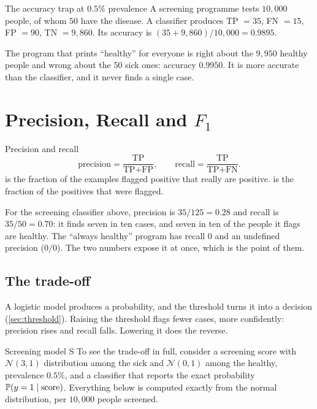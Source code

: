 \begin{workedexample}{The accuracy trap at $0.5\%$ prevalence}
A screening programme tests $10{,}000$ people, of whom $50$ have the disease. A
classifier produces TP $= 35$, FN $= 15$, FP $= 90$, TN $= 9{,}860$. Its accuracy
is $(35 + 9{,}860)/10{,}000 = 0.9895$.

The program that prints ``healthy'' for everyone is right about the $9{,}950$
healthy people and wrong about the $50$ sick ones: accuracy $0.9950$. It is more
accurate than the classifier, and it never finds a single case.
\end{workedexample}

\section{Precision, Recall and \texorpdfstring{$F_1$}{F1}}
\label{sec:precision-recall}

\begin{defbox}{Precision and recall}
\[
  \text{precision} = \frac{\text{TP}}{\text{TP} + \text{FP}}, \qquad
  \text{recall} = \frac{\text{TP}}{\text{TP} + \text{FN}} .
\]
 is the fraction of the examples flagged positive that really
are positive.  is the fraction of the positives that were flagged.
\end{defbox}

For the screening classifier above, precision is $35/125 = 0.28$ and recall is
$35/50 = 0.70$: it finds seven in ten cases, and seven in ten of the people it
flags are healthy. The ``always healthy'' program has recall $0$ and an undefined
precision ($0/0$). The two numbers expose it at once, which is the point of them.

\subsection{The trade-off}

A logistic model produces a probability, and the threshold turns it into a
decision (\cref{sec:threshold}). Raising the threshold flags fewer cases, more
confidently: precision rises and recall falls. Lowering it does the reverse.

\begin{defbox}{Screening model S}
To see the trade-off in full, consider a screening score with
$\mathcal{N}(3,1)$ distribution among the sick and $\mathcal{N}(0,1)$ among the
healthy, prevalence $0.5\%$, and a classifier that reports the exact
probability $\mathbb{P}(y = 1 \mid \text{score})$. Everything below is computed
exactly from the normal distribution, per $10{,}000$ people screened.
\end{defbox}

